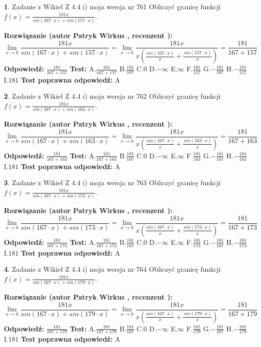 \documentclass[12pt, a4paper]{article}
\theoremstyle{definition} %
\newtheorem{zad}{}
\newcommand{\zadStart}[1]{\begin{zad}#1\newline}
\newcommand{\zadStop}{\end{zad}}
\newcommand{\rozwStart}[2]{\noindent \textbf{Rozwiązanie (autor #1 , recenzent #2): }\newline}
\newcommand{\rozwStop}{\newline}
\newcommand{\odpStart}{\noindent \textbf{Odpowiedź:}\newline}
\newcommand{\odpStop}{\newline}
\newcommand{\testStart}{\noindent \textbf{Test:}\newline}
\newcommand{\testStop}{\newline}
\newcommand{\kluczStart}{\noindent \textbf{Test poprawna odpowiedź:}\newline}
\newcommand{\kluczStop}{\newline}
\begin{document}
\zadStart{Zadanie z Wikieł Z 4.4 i) moja wersja nr 761}
Obliczyć granicę funkcji $f(x)=\frac{181x}{sin(167\cdot x) +sin(157\cdot x)}$.
\zadStop
\rozwStart{Patryk Wirkus}{}
$$\lim\limits_{x\to 0}\frac{181x}{sin(167\cdot x) +sin(157\cdot x)}=\lim\limits_{x\to 0}\frac{181x}{x(\frac{sin(167\cdot x)}{x}+\frac{sin(157\cdot x)}{x})}=\frac{181}{167+157}$$
\rozwStop
\odpStart
$\frac{181}{167+157}$
\odpStop
\testStart
A.$\frac{181}{167+157}$
B.$\frac{181}{167}$
C.$0$
D.$-\infty$
E.$\infty$
F.$\frac{181}{157}$
G.$-\frac{181}{167}$
H.$-\frac{181}{157}$
I.$181$
\testStop
\kluczStart
A
\kluczStop



\zadStart{Zadanie z Wikieł Z 4.4 i) moja wersja nr 762}
Obliczyć granicę funkcji $f(x)=\frac{181x}{sin(167\cdot x) +sin(163\cdot x)}$.
\zadStop
\rozwStart{Patryk Wirkus}{}
$$\lim\limits_{x\to 0}\frac{181x}{sin(167\cdot x) +sin(163\cdot x)}=\lim\limits_{x\to 0}\frac{181x}{x(\frac{sin(167\cdot x)}{x}+\frac{sin(163\cdot x)}{x})}=\frac{181}{167+163}$$
\rozwStop
\odpStart
$\frac{181}{167+163}$
\odpStop
\testStart
A.$\frac{181}{167+163}$
B.$\frac{181}{167}$
C.$0$
D.$-\infty$
E.$\infty$
F.$\frac{181}{163}$
G.$-\frac{181}{167}$
H.$-\frac{181}{163}$
I.$181$
\testStop
\kluczStart
A
\kluczStop



\zadStart{Zadanie z Wikieł Z 4.4 i) moja wersja nr 763}
Obliczyć granicę funkcji $f(x)=\frac{181x}{sin(167\cdot x) +sin(173\cdot x)}$.
\zadStop
\rozwStart{Patryk Wirkus}{}
$$\lim\limits_{x\to 0}\frac{181x}{sin(167\cdot x) +sin(173\cdot x)}=\lim\limits_{x\to 0}\frac{181x}{x(\frac{sin(167\cdot x)}{x}+\frac{sin(173\cdot x)}{x})}=\frac{181}{167+173}$$
\rozwStop
\odpStart
$\frac{181}{167+173}$
\odpStop
\testStart
A.$\frac{181}{167+173}$
B.$\frac{181}{167}$
C.$0$
D.$-\infty$
E.$\infty$
F.$\frac{181}{173}$
G.$-\frac{181}{167}$
H.$-\frac{181}{173}$
I.$181$
\testStop
\kluczStart
A
\kluczStop



\zadStart{Zadanie z Wikieł Z 4.4 i) moja wersja nr 764}
Obliczyć granicę funkcji $f(x)=\frac{181x}{sin(167\cdot x) +sin(179\cdot x)}$.
\zadStop
\rozwStart{Patryk Wirkus}{}
$$\lim\limits_{x\to 0}\frac{181x}{sin(167\cdot x) +sin(179\cdot x)}=\lim\limits_{x\to 0}\frac{181x}{x(\frac{sin(167\cdot x)}{x}+\frac{sin(179\cdot x)}{x})}=\frac{181}{167+179}$$
\rozwStop
\odpStart
$\frac{181}{167+179}$
\odpStop
\testStart
A.$\frac{181}{167+179}$
B.$\frac{181}{167}$
C.$0$
D.$-\infty$
E.$\infty$
F.$\frac{181}{179}$
G.$-\frac{181}{167}$
H.$-\frac{181}{179}$
I.$181$
\testStop
\kluczStart
A
\kluczStop
\end{document}
